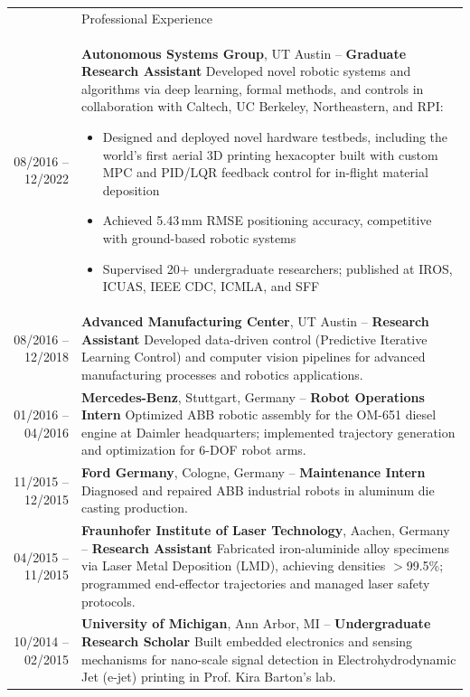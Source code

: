 \documentclass[letterpaper, 11pt]{article}
\newcommand{\headingfont}{\Large\color{CustomBlue}}
\newenvironment{SectionTable}[1]{
	\renewcommand*{\arraystretch}{1.3} %
	\setlength{\tabcolsep}{10pt}
	\begin{longtable}{Rp{4.9in}} & #1 \\}
{\end{longtable}}
\begin{document}
\begin{SectionTable}{\headingfont Professional Experience}
08/2016 -- 12/2022 &
\textbf{Autonomous Systems Group}, UT Austin -- \textbf{Graduate Research Assistant} \newline
Developed novel robotic systems and algorithms via deep learning, formal methods, and controls in collaboration with Caltech, UC Berkeley, Northeastern, and RPI:
\begin{itemize}[noitemsep, topsep=2pt]
\item Designed and deployed novel hardware testbeds, including the world's first aerial 3D printing hexacopter built with custom MPC and PID/LQR feedback control for in-flight material deposition
\item Achieved 5.43\,mm RMSE positioning accuracy, competitive with ground-based robotic systems
\item Supervised 20+ undergraduate researchers; published at IROS, ICUAS, IEEE CDC, ICMLA, and SFF
\end{itemize} \\

08/2016 -- 12/2018 &
\textbf{Advanced Manufacturing Center}, UT Austin -- \textbf{Research Assistant} \newline
Developed data-driven control (Predictive Iterative Learning Control) and computer vision pipelines for advanced manufacturing processes and robotics applications. \\

01/2016 -- 04/2016 &
\textbf{Mercedes-Benz}, Stuttgart, Germany -- \textbf{Robot Operations Intern} \newline
Optimized ABB robotic assembly for the OM-651 diesel engine at Daimler headquarters; implemented trajectory generation and optimization for 6-DOF robot arms. \\

11/2015 -- 12/2015 &
\textbf{Ford Germany}, Cologne, Germany -- \textbf{Maintenance Intern} \newline
Diagnosed and repaired ABB industrial robots in aluminum die casting production. \\

04/2015 -- 11/2015 &
\textbf{Fraunhofer Institute of Laser Technology}, Aachen, Germany -- \textbf{Research Assistant} \newline
Fabricated iron-aluminide alloy specimens via Laser Metal Deposition (LMD), achieving densities $>$99.5\%; programmed end-effector trajectories and managed laser safety protocols. \\

10/2014 -- 02/2015 &
\textbf{University of Michigan}, Ann Arbor, MI -- \textbf{Undergraduate Research Scholar} \newline
Built embedded electronics and sensing mechanisms for nano-scale signal detection in Electrohydrodynamic Jet (e-jet) printing in Prof. Kira Barton's lab. \\


\end{SectionTable}
\end{document}
